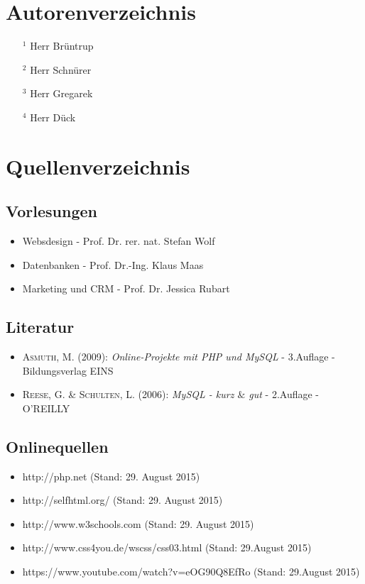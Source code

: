 \newpage
\section{Autorenverzeichnis}
\begin{itemize}
	\item[$^1$] Herr Brüntrup
	\item[$^2$] Herr Schnürer
	\item[$^3$] Herr Gregarek
	\item[$^4$] Herr Dück
\end{itemize}



\section{Quellenverzeichnis}

\subsection*{Vorlesungen}
\begin{itemize}
	\item Websdesign - Prof. Dr. rer. nat. Stefan Wolf
	\item Datenbanken - Prof. Dr.-Ing. Klaus Maas
	\item Marketing und CRM - Prof. Dr. Jessica Rubart
\end{itemize}

\subsection*{Literatur}
\begin{itemize}
	\item \textsc{Asmuth, M.} (2009): \textit{Online-Projekte mit PHP und MySQL} -  3.Auflage - \\ Bildungsverlag EINS
	\item \textsc{Reese, G. \&  Schulten, L.} (2006): \textit{MySQL - kurz $\&$ gut} -  2.Auflage - O'REILLY
\end{itemize}

\subsection*{Onlinequellen}
\begin{itemize}
	\item http://php.net (Stand: 29. August 2015)
	\item http://selfhtml.org/ (Stand: 29. August 2015)
	\item http://www.w3schools.com (Stand: 29. August 2015)
	\item http://www.css4you.de/wscss/css03.html (Stand: 29.August 2015)
	\item https://www.youtube.com/watch?v=eOG90Q8EfRo (Stand: 29.August 2015)
\end{itemize}

